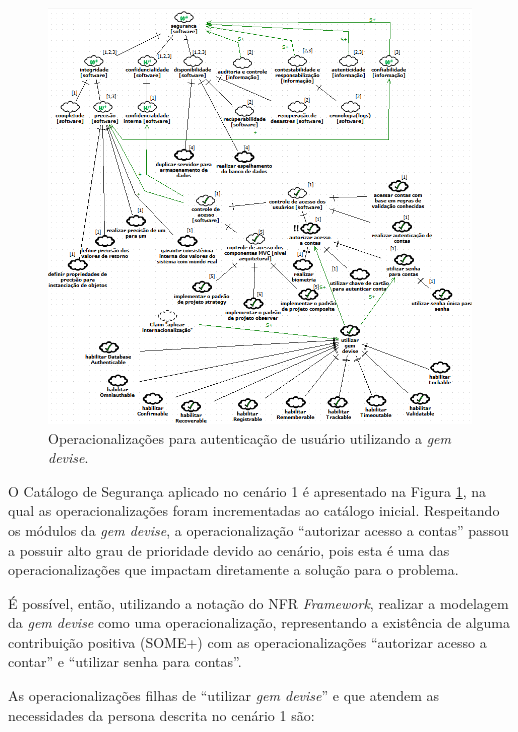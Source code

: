 \pagebreak

\begin{figure}[h!]
	\centering
	\includegraphics[keepaspectratio=true,scale=0.7]{figuras/catalogoPersona1.PNG}
	\caption{Operacionalizações para autenticação de usuário utilizando a \textit{gem devise}.}
	\label{catalogoPersona1}
\end{figure}


O Catálogo de Segurança aplicado no cenário 1 é apresentado na Figura \ref{catalogoPersona1}, na qual as operacionalizações foram incrementadas ao catálogo inicial. Respeitando os módulos da \textit{gem devise}, a operacionalização  “autorizar acesso a contas” passou a possuir alto grau de prioridade devido ao cenário, pois esta é uma das operacionalizações que impactam diretamente a solução para o problema. 

É possível, então, utilizando a notação do NFR \textit{Framework}, realizar a modelagem da \textit{gem devise} como uma operacionalização, representando a existência de alguma contribuição positiva (SOME+) com as operacionalizações  “autorizar acesso a contar” e “utilizar senha para contas”.
 
As operacionalizações filhas de “utilizar \textit{gem devise}” e que atendem as necessidades da persona descrita no cenário 1 são:

